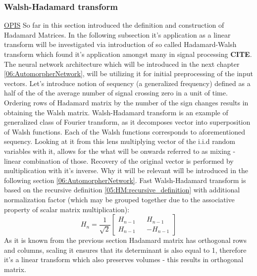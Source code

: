 \subsubsection{Walsh-Hadamard transform}
\label{05:sub_hadamard_walsh}
\href{https://www.mathworks.com/help/signal/ug/walshhadamard-transform.html}{OPIS}
So far in this section introduced the definition and construction of Hadamard Matrices. In the following subsection it's application as a linear transform will be investigated via introduction of so called Hadamard-Walsh transform which found it's application amongst many in signal processing {\color{red} \textbf{CITE}}. The neural network architecture which will be introduced in the next chapter \ref{06:AutomorpherNetwork}, will be utilizing it for initial preprocessing of the input vectors. 
Let's introduce notion of sequency (a generalized frequency) defined as a half of the of the average number of signal crossing zero in a unit of time. 
Ordering rows of Hadamard matrix by the number of the sign changes results in obtaining the Walsh matrix.
Walsh-Hadamard transform is an example of generalized class of Fourier transform, as it decomposes vector into superposition of Walsh functions. Each of the Walsh functions corresponds to  aforementioned sequency. Looking at it from this lens multiplying vector of the i.i.d random variables with it, allows for the what will be onwards referred to as mixing - linear combination of those. Recovery of the original vector is performed by multiplication with it's inverse. Why it will be relevant will be introduced in the following section \ref{06:AutomorpherNetwork}.
Fast Walsh-Hadamard transform is based on the recursive definition \ref{05:HM:recursive_definition} with additional normalization factor (which may be grouped together due to the associative property of scalar matrix multiplication):
\begin{equation}
    H_n = \frac{1}{\sqrt{2}}\begin{bmatrix}
        H_{n-1} && H_{n-1} \\
        H_{n-1} && -H_{n-1}
    \end{bmatrix}
\end{equation}
As it is known from the previous section Hadamard matrix has orthogonal rows and columns, scaling it ensures that its determinant is also equal to 1, therefore it's a linear transform which also preserves volumes - this results in  orthogonal matrix.

